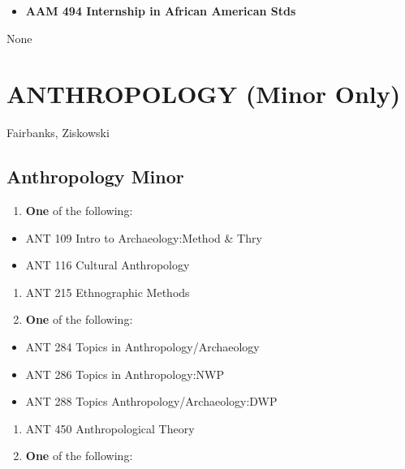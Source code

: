 \documentclass[
  letterpaper,
]{scrbook}
\providecommand{\tightlist}{%
  \setlength{\itemsep}{0pt}\setlength{\parskip}{0pt}}
\begin{document}
\begin{itemize}
\tightlist
\item
  \textbf{AAM 494 Internship in African American Stds}
\end{itemize}

None

\section{ANTHROPOLOGY (Minor Only)}\label{anthropology-minor-only}

Fairbanks, Ziskowski

\subsection{Anthropology Minor}\label{anthropology-minor}

\begin{enumerate}
\def\labelenumi{\arabic{enumi}.}
\tightlist
\item
  \textbf{One} of the following:
\end{enumerate}

\begin{itemize}
\tightlist
\item
  ANT 109 Intro to Archaeology:Method \& Thry
\item
  ANT 116 Cultural Anthropology
\end{itemize}

\begin{enumerate}
\def\labelenumi{\arabic{enumi}.}
\setcounter{enumi}{1}
\tightlist
\item
  ANT 215 Ethnographic Methods
\item
  \textbf{One} of the following:
\end{enumerate}

\begin{itemize}
\tightlist
\item
  ANT 284 Topics in Anthropology/Archaeology
\item
  ANT 286 Topics in Anthropology:NWP
\item
  ANT 288 Topics Anthropology/Archaeology:DWP
\end{itemize}

\begin{enumerate}
\def\labelenumi{\arabic{enumi}.}
\setcounter{enumi}{3}
\tightlist
\item
  ANT 450 Anthropological Theory
\item
  \textbf{One} of the following:
\end{enumerate}
\end{document}
